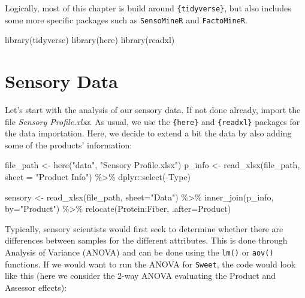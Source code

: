 \documentclass[
]{book}
\newenvironment{Shaded}{\begin{snugshade}}{\end{snugshade}}
\newcommand{\AttributeTok}[1]{\textcolor[rgb]{0.77,0.63,0.00}{#1}}
\newcommand{\FunctionTok}[1]{\textcolor[rgb]{0.00,0.00,0.00}{#1}}
\newcommand{\NormalTok}[1]{#1}
\newcommand{\OtherTok}[1]{\textcolor[rgb]{0.56,0.35,0.01}{#1}}
\newcommand{\SpecialCharTok}[1]{\textcolor[rgb]{0.00,0.00,0.00}{#1}}
\newcommand{\StringTok}[1]{\textcolor[rgb]{0.31,0.60,0.02}{#1}}
\begin{document}
Logically, most of this chapter is build around \texttt{\{tidyverse\}}, but also includes some more specific packages such as \texttt{SensoMineR} and \texttt{FactoMineR}.

\begin{Shaded}
\begin{Highlighting}[]
\FunctionTok{library}\NormalTok{(tidyverse)}
\FunctionTok{library}\NormalTok{(here)}
\FunctionTok{library}\NormalTok{(readxl)}
\end{Highlighting}
\end{Shaded}

\hypertarget{sensory-data}{%
\section{Sensory Data}\label{sensory-data}}

Let's start with the analysis of our sensory data. If not done already, import the file \emph{Sensory Profile.xlsx}.
As usual, we use the \texttt{\{here\}} and \texttt{\{readxl\}} packages for the data importation. Here, we decide to extend a bit the data by also adding some of the products' information:

\begin{Shaded}
\begin{Highlighting}[]
\NormalTok{file\_path }\OtherTok{\textless{}{-}} \FunctionTok{here}\NormalTok{(}\StringTok{"data"}\NormalTok{, }\StringTok{"Sensory Profile.xlsx"}\NormalTok{) }
\NormalTok{p\_info }\OtherTok{\textless{}{-}} \FunctionTok{read\_xlsx}\NormalTok{(file\_path, }\AttributeTok{sheet =} \StringTok{"Product Info"}\NormalTok{) }\SpecialCharTok{\%\textgreater{}\%} 
\NormalTok{  dplyr}\SpecialCharTok{::}\FunctionTok{select}\NormalTok{(}\SpecialCharTok{{-}}\NormalTok{Type)}

\NormalTok{sensory }\OtherTok{\textless{}{-}} \FunctionTok{read\_xlsx}\NormalTok{(file\_path, }\AttributeTok{sheet=}\StringTok{"Data"}\NormalTok{) }\SpecialCharTok{\%\textgreater{}\%} 
  \FunctionTok{inner\_join}\NormalTok{(p\_info, }\AttributeTok{by=}\StringTok{"Product"}\NormalTok{) }\SpecialCharTok{\%\textgreater{}\%} 
  \FunctionTok{relocate}\NormalTok{(Protein}\SpecialCharTok{:}\NormalTok{Fiber, }\AttributeTok{.after=}\NormalTok{Product)}
\end{Highlighting}
\end{Shaded}

Typically, sensory scientists would first seek to determine whether there are differences between samples for the different attributes. This is done through Analysis of Variance (ANOVA) and can be done using the \texttt{lm()} or \texttt{aov()} functions.
If we would want to run the ANOVA for \texttt{Sweet}, the code would look like this (here we consider the 2-way ANOVA evaluating the Product and Assessor effects):
\end{document}
